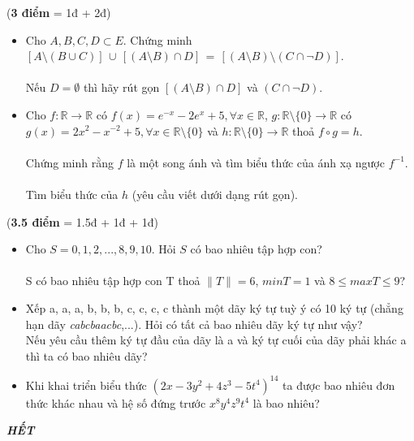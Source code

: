 \documentclass[a4paper]{exam}
\begin{document}
\begin{questions}
\begin{itemize}
			\end{itemize}
		\question (\textbf{3 điểm} = 1đ + 2đ)
			\begin{itemize}
				\item Cho $ A, B, C, D \subset E$. Chứng minh $\left[A \setminus (B \cup C) \right] \, \cup \, \left[(A \setminus B) \cap D \right] \, = \, \left[(A \setminus B) \setminus (C \cap \neg D)\right]$.\\
				\\Nếu $D = \emptyset$ thì hãy rút gọn $\left[(A \setminus B) \cap D \right]$ và $(C \cap \neg D)$.\\
				\item Cho $f: \mathbb{R} \longrightarrow \mathbb{R}$ có $f(x) = e^{-x} - 2e^{x} + 5, \forall x \in \mathbb{R}$, $g: \mathbb{R} \setminus \{0\} \longrightarrow \mathbb{R}$ có $g(x) = 2x^{2} - x^{-2} + 5, \forall x \in \mathbb{R} \setminus \{0\}$ và $h: \mathbb{R} \setminus \{0\} \longrightarrow \mathbb{R}$ thoả $f \circ g = h$.\\
				\\Chứng minh rằng $f$ là một song ánh và tìm biểu thức của ánh xạ ngược $f^{-1}$.\\
				\\Tìm biểu thức của $h$ (yêu cầu viết dưới dạng rút gọn).\\
 			\end{itemize}
 		\question (\textbf{3.5 điểm} = 1.5đ + 1đ + 1đ)
 			\begin{itemize}
 				\item Cho $S = {0, 1, 2,..., 8, 9, 10}$. Hỏi $S$ có bao nhiêu tập hợp con?\\
 				\\S có bao nhiêu tập hợp con T thoả $\|T\| = 6$, $minT = 1$ và $8 \leq maxT \leq 9$?\\
 				\item Xếp a, a, a, b, b, b, c, c, c, c thành một dãy ký tự tuỳ ý có 10 ký tự (chẳng hạn dãy \textit{cabcbaacbc},...). Hỏi có tất cả bao nhiêu dãy ký tự như vậy?\\
 				Nếu yêu cầu thêm ký tự đầu của dãy là a và ký tự cuối của dãy phải khác a thì ta có bao nhiêu dãy?\\
 				\item Khi khai triển biểu thức $(2x - 3y^{2} + 4z^{3} - 5t^{4})^{14} $ ta được bao nhiêu đơn thức khác nhau và hệ số đứng trước $x^{8}y^{4}z^{9}t^{4}$ là bao nhiêu?\\ 
 			\end{itemize}
	\end{questions}
	\hspace*{0pt}\hfill \textit{\textbf{HẾT}}
	
\end{document}
